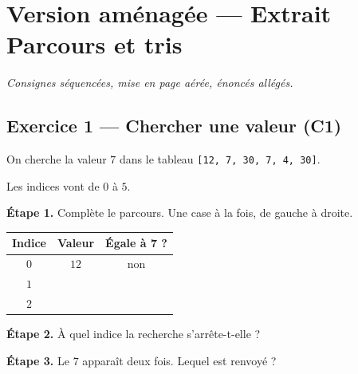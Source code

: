 \section*{Version aménagée --- Extrait Parcours et tris}
\textit{Consignes séquencées, mise en page aérée, énoncés allégés.}

\bigskip

\subsection*{Exercice 1 --- Chercher une valeur (C1)}

On cherche la valeur $7$ dans le tableau \texttt{[12, 7, 30, 7, 4, 30]}.

\medskip
Les indices vont de $0$ à $5$.

\bigskip

\textbf{Étape 1.} Complète le parcours. Une case à la fois, de gauche à droite.

\bigskip

\begin{center}
\begin{tabular}{|c|c|c|}
\hline
\textbf{Indice} & \textbf{Valeur} & \textbf{Égale à 7 ?} \\
\hline
$0$ & $12$ & non \\
\hline
$1$ & \dotfill & \dotfill \\
\hline
$2$ & \dotfill & \dotfill \\
\hline
\end{tabular}
\end{center}

\bigskip

\textbf{Étape 2.} À quel indice la recherche s'arrête-t-elle ?

\medskip
\dotfill

\bigskip

\textbf{Étape 3.} Le $7$ apparaît deux fois. Lequel est renvoyé ?

\medskip
\begin{center}
 \qquad {}
\end{center}

